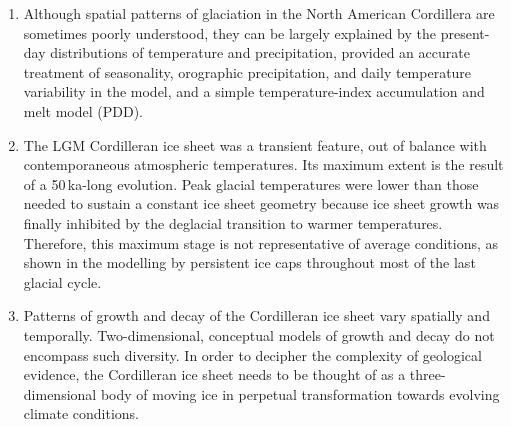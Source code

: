 \documentclass[a4paper]{kappa}
\begin{document}
\begin{enumerate}

\item Although spatial patterns of glaciation in the North American Cordillera
are sometimes poorly understood, they can be largely explained by the
present-day distributions of temperature and precipitation, provided an
accurate treatment of seasonality, orographic precipitation, and daily
temperature variability in the model, and a simple temperature-index
accumulation and melt model (PDD).

\item The LGM Cordilleran ice sheet was a transient feature, out of balance
with contemporaneous atmospheric temperatures. Its maximum extent is the result
of a 50\,ka-long evolution. Peak glacial temperatures were lower than those
needed to sustain a constant ice sheet geometry because ice sheet growth was
finally inhibited by the deglacial transition to warmer temperatures.
Therefore, this maximum stage is not representative of average conditions, as
shown in the modelling by persistent ice caps throughout most of the last
glacial cycle.

\item Patterns of growth and decay of the Cordilleran ice sheet vary spatially
and temporally. Two-dimensional, conceptual models of growth and decay
\citep[e.g.][]{Fulton.1991, Margold.etal.2013a} do not encompass such
diversity. In order to decipher the complexity of geological evidence, the
Cordilleran ice sheet needs to be thought of as a three-dimensional body of
moving ice in perpetual transformation towards evolving climate conditions.

\end{enumerate}

\renewcommand{\urlprefix}[0]{}  %



\end{document}
